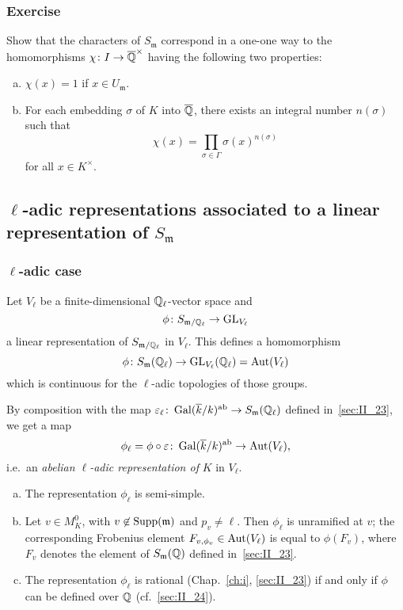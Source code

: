 \subsubsection*{Exercise}
Show that the characters of $S_{\mathfrak{m}}$ correspond in a one-one way to
the homomorphisms $\chi \colon I \to \overline{\mathbb{Q}}^\times$ having the following
two properties:
\begin{enumerate}[(a)]
\item $\chi(x) = 1$ if $x \in U_{\mathfrak{m}}$.
\item For each embedding $\sigma$ of $K$ into $\overline{\mathbb{Q}}$, there exists an
	integral number $n(\sigma)$ such that
	\[
		\chi(x) = \prod_{\sigma \in \Gamma} \sigma(x)^{n(\sigma)}
	\]
	for all $x \in K^\times$.
\end{enumerate}

\subsection{\texorpdfstring{$\ell$}{ℓ}-adic representations associated to a
linear representation of \texorpdfstring{$S_{\mathfrak{m}}$}{Sm}}
\label{sec:II_25}
\dpage

\subsubsection{\texorpdfstring{$\ell$}{ℓ}-adic case}
\label{sec:II_25_1}

Let $V_\ell$ be a finite-dimensional $\mathbb{Q}_\ell$-vector space and
\[
	\phi \colon S_{\mathfrak{m}/\mathbb{Q}_\ell} \rightarrow
	\operatorname{GL}_{V_\ell}
\]
a linear representation of $S_{\mathfrak{m}/\mathbb{Q}_\ell}$ in $V_\ell$. This 
defines a homomorphism
\[
	\phi \colon S_\mathfrak{m}(\mathbb{Q}_\ell) \rightarrow \operatorname{GL}_{V_\ell}(\mathbb{Q}_\ell) = 
	\operatorname{Aut}(V_\ell)
\]
which is continuous for the $\ell$-adic topologies of those groups.

By composition with the map $\varepsilon_\ell \colon \operatorname{Gal}(\overline{k}/k)^{\mathrm{ab}}
\to S_{\mathfrak{m}} (\mathbb{Q}_\ell)$ defined in~\ref{sec:II_23}, we get a map
\[
	\phi_\ell = \phi \circ \varepsilon \colon \operatorname{Gal}(\overline{k}/k)^{\mathrm{ab}} \to
	\operatorname{Aut}(V_\ell),
\]
i.e.\ an \emph{abelian $\ell$-adic representation of} $K$ in $V_\ell$.

\begin{prop}
\begin{enumerate}[a), series=prII_25_1]
\item\label{prop:II_25_a}
	The representation $\phi_\ell$ is semi-simple.
\item\label{prop:II_25_b}
	Let $v \in M_K^0$, with $v \not\in \operatorname{Supp}(\mathfrak{m})$ and $p_v \neq 
	\ell$.
	Then $\phi_\ell$ is unramified at $v$; the corresponding Frobenius element 
	$F_{v, \phi_v} \in \operatorname{Aut}(V_\ell)$ is equal to $\phi(F_v)$, where $F_v$ denotes 
	the element of $S_\mathfrak{m}(\mathbb{Q})$ defined in~\ref{sec:II_23}.
	\dpage
\item\label{prop:II_25_c}
	The representation $\phi_\ell$ is rational (Chap.~\ref{ch:i},
	\ref{sec:II_23}) if and only if $\phi$ can be defined over $\mathbb{Q}$
	(cf.\ \ref{sec:II_24}).
\end{enumerate}
\end{prop}

